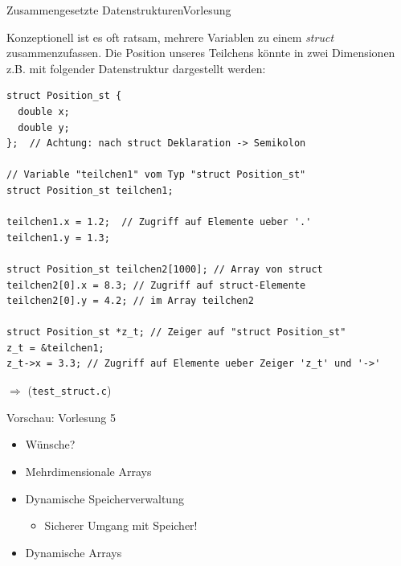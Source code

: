 \documentclass[xcolor=dvipsnames]{beamer}
\newcounter{lecturecounter}
\begin{document}
\begin{frame}[fragile]{Zusammengesetzte Datenstrukturen}{Vorlesung }
\begin{block}{}
Konzeptionell ist es oft ratsam, mehrere Variablen zu einem \emph{struct} zusammenzufassen.
Die Position unseres Teilchens könnte in zwei Dimensionen z.B. mit folgender Datenstruktur dargestellt werden:
\end{block}
\begin{lstlisting}[basicstyle=\ttfamily\scriptsize]
struct Position_st {
  double x;
  double y;
};  // Achtung: nach struct Deklaration -> Semikolon

// Variable "teilchen1" vom Typ "struct Position_st"
struct Position_st teilchen1;

teilchen1.x = 1.2;  // Zugriff auf Elemente ueber '.' 
teilchen1.y = 1.3;

struct Position_st teilchen2[1000]; // Array von struct
teilchen2[0].x = 8.3; // Zugriff auf struct-Elemente 
teilchen2[0].y = 4.2; // im Array teilchen2

struct Position_st *z_t; // Zeiger auf "struct Position_st"
z_t = &teilchen1;
z_t->x = 3.3; // Zugriff auf Elemente ueber Zeiger 'z_t' und '->'
\end{lstlisting}
\vspace{-0.1cm}
$\Rightarrow$ (\verb|test_struct.c|)
\end{frame}

\begin{frame}[fragile]{Vorschau: Vorlesung 5}
  \begin{itemize}
    \item{Wünsche?}
    \vspace{0.3cm}
    \item{Mehrdimensionale Arrays}
    \vspace{0.3cm}
    \item{Dynamische Speicherverwaltung}
    \begin{itemize}
      \item{Sicherer Umgang mit Speicher!}
    \end{itemize}
    \vspace{0.3cm}
    \item{Dynamische Arrays}
  \end{itemize}
\end{frame}

\end{document}
